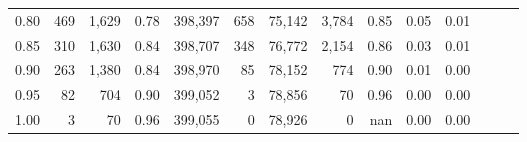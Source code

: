 \begin{tabular}{rrrrrrrrrrrrrr}
0.80 &      469 &  1,629 &  0.78 &  398,397 &      658 &  75,142 &   3,784 &  0.85 &  0.05 &      0.01 \\
0.85 &      310 &  1,630 &  0.84 &  398,707 &      348 &  76,772 &   2,154 &  0.86 &  0.03 &      0.01 \\
0.90 &      263 &  1,380 &  0.84 &  398,970 &       85 &  78,152 &     774 &  0.90 &  0.01 &      0.00 \\
0.95 &       82 &    704 &  0.90 &  399,052 &        3 &  78,856 &      70 &  0.96 &  0.00 &      0.00 \\
1.00 &        3 &     70 &  0.96 &  399,055 &        0 &  78,926 &       0 &   nan &  0.00 &      0.00 \\
\bottomrule
\end{tabular}
